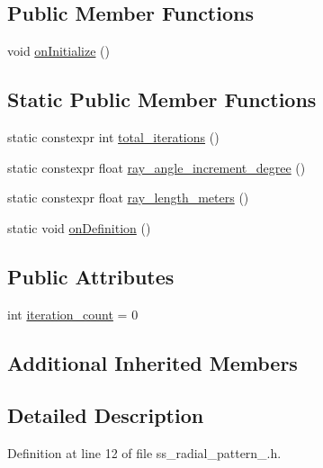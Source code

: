 \subsection*{Public Member Functions}
\begin{DoxyCompactItemize}
\item 
void \hyperlink{structsm__dance__bot_1_1SS1_1_1SsRadialPattern1_a360cb42e4b33cb70e162f8685c996344}{on\+Initialize} ()
\end{DoxyCompactItemize}
\subsection*{Static Public Member Functions}
\begin{DoxyCompactItemize}
\item 
static constexpr int \hyperlink{structsm__dance__bot_1_1SS1_1_1SsRadialPattern1_a676b62029d1fb0f6a6b5c9587de53eaa}{total\+\_\+iterations} ()
\item 
static constexpr float \hyperlink{structsm__dance__bot_1_1SS1_1_1SsRadialPattern1_a32a973bd088878e6c2b43b49bda2e2c9}{ray\+\_\+angle\+\_\+increment\+\_\+degree} ()
\item 
static constexpr float \hyperlink{structsm__dance__bot_1_1SS1_1_1SsRadialPattern1_ae04f0d0feb2d7d4b0dba0c81f69f32db}{ray\+\_\+length\+\_\+meters} ()
\item 
static void \hyperlink{structsm__dance__bot_1_1SS1_1_1SsRadialPattern1_a4ac019d02458855ca7ecc05ab553fae3}{on\+Definition} ()
\end{DoxyCompactItemize}
\subsection*{Public Attributes}
\begin{DoxyCompactItemize}
\item 
int \hyperlink{structsm__dance__bot_1_1SS1_1_1SsRadialPattern1_a148a819e2406f494f14afae15e1497b5}{iteration\+\_\+count} = 0
\end{DoxyCompactItemize}
\subsection*{Additional Inherited Members}


\subsection{Detailed Description}


Definition at line 12 of file ss\+\_\+radial\+\_\+pattern\+\_.\+h.



